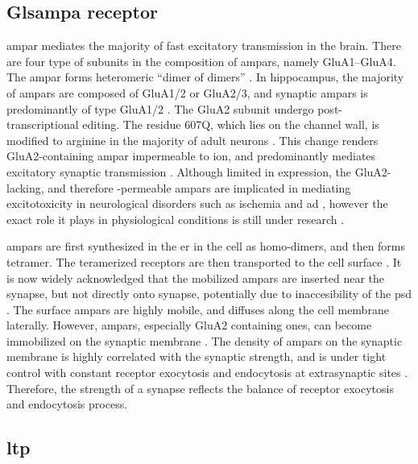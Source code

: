 \subsection{Gls{ampa} receptor}

\gls{ampar} mediates the majority of fast excitatory transmission in the brain. There are four type of subunits in the composition of \glspl{ampar}, namely GluA1--GluA4. The \gls{ampar} forms heteromeric ``dimer of dimers'' \citep{ayalon01}. In hippocampus, the majority of \glspl{ampar} are composed of GluA1/2 or GluA2/3, and synaptic \glspl{ampar} is predominantly of type GluA1/2 \citep{wenthold96, lu09}. The GluA2 subunit undergo post-transcriptional editing. The residue 607Q, which lies on the channel wall, is modified to arginine in the majority of adult neurons \citep{greger03}. This change renders GluA2-containing \gls{ampar} impermeable to  ion, and predominantly mediates excitatory synaptic transmission \citep{sommer91,swanson97}. Although limited in expression, the GluA2-lacking, and therefore -permeable \glspl{ampar} are implicated in mediating excitotoxicity in neurological disorders such as ischemia and \gls{ad} \citep{kwak06, whitehead17}, however the exact role it plays in physiological conditions is still under research \citep{whitehead17}.



\Glspl{ampar} are first synthesized in the \gls{er} in the cell as homo-dimers, and then forms tetramer. The teramerized receptors are then transported to the cell surface \citep{henley13}. It is now widely acknowledged that the mobilized \glspl{ampar} are inserted near the synapse, but not directly onto synapse, potentially due to inaccesibility of the \gls{psd} \citep{henley11, chater14}. The surface \glspl{ampar} are highly mobile, and diffuses along the cell membrane laterally. However, \glspl{ampar}, especially GluA2 containing ones, can become immobilized on the synaptic membrane \citep{borgdorff02, groc04}. The density of \glspl{ampar} on the synaptic membrane is highly correlated with the synaptic strength, and is under tight control with constant receptor exocytosis and endocytosis at extrasynaptic sites \citep{malinow02, henley11}. Therefore, the strength of a synapse reflects the balance of receptor exocytosis and endocytosis process. 



\subsection{\gls{ltp}}

